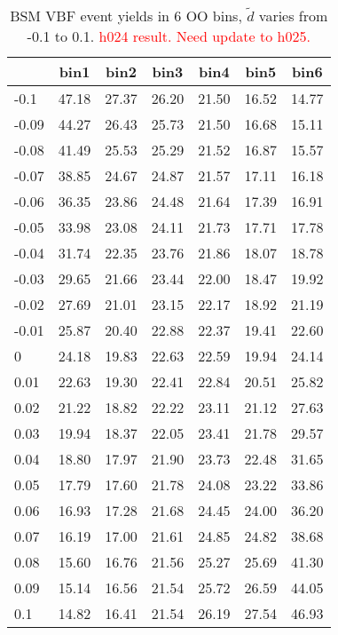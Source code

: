 \begin{table}[ht]
\begin{center}
\begin{tabular}{l|cccccc}
\hline
      & bin1  & bin2  & bin3  & bin4  & bin5  & bin6  \\ \hline
-0.1  & 47.18 & 27.37 & 26.20 & 21.50 & 16.52 & 14.77 \\
-0.09 & 44.27 & 26.43 & 25.73 & 21.50 & 16.68 & 15.11 \\
-0.08 & 41.49 & 25.53 & 25.29 & 21.52 & 16.87 & 15.57 \\
-0.07 & 38.85 & 24.67 & 24.87 & 21.57 & 17.11 & 16.18 \\
-0.06 & 36.35 & 23.86 & 24.48 & 21.64 & 17.39 & 16.91 \\
-0.05 & 33.98 & 23.08 & 24.11 & 21.73 & 17.71 & 17.78 \\
-0.04 & 31.74 & 22.35 & 23.76 & 21.86 & 18.07 & 18.78 \\
-0.03 & 29.65 & 21.66 & 23.44 & 22.00 & 18.47 & 19.92 \\
-0.02 & 27.69 & 21.01 & 23.15 & 22.17 & 18.92 & 21.19 \\
-0.01 & 25.87 & 20.40 & 22.88 & 22.37 & 19.41 & 22.60 \\
0     & 24.18 & 19.83 & 22.63 & 22.59 & 19.94 & 24.14 \\
0.01  & 22.63 & 19.30 & 22.41 & 22.84 & 20.51 & 25.82 \\
0.02  & 21.22 & 18.82 & 22.22 & 23.11 & 21.12 & 27.63 \\
0.03  & 19.94 & 18.37 & 22.05 & 23.41 & 21.78 & 29.57 \\
0.04  & 18.80 & 17.97 & 21.90 & 23.73 & 22.48 & 31.65 \\
0.05  & 17.79 & 17.60 & 21.78 & 24.08 & 23.22 & 33.86 \\
0.06  & 16.93 & 17.28 & 21.68 & 24.45 & 24.00 & 36.20 \\
0.07  & 16.19 & 17.00 & 21.61 & 24.85 & 24.82 & 38.68 \\
0.08  & 15.60 & 16.76 & 21.56 & 25.27 & 25.69 & 41.30 \\
0.09  & 15.14 & 16.56 & 21.54 & 25.72 & 26.59 & 44.05 \\
0.1   & 14.82 & 16.41 & 21.54 & 26.19 & 27.54 & 46.93 \\
\hline
\end{tabular}
\caption{BSM VBF event yields in 6 OO bins, $\tilde{d}$ varies from -0.1 to 0.1. \textcolor{red}{h024 result. Need update to h025.} }
\label{tab:NevtBSM}
\end{center}
\end{table}



